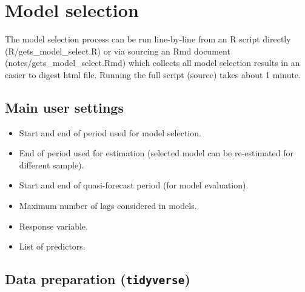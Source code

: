 \documentclass[
  letterpaper,
  DIV=11,
  numbers=noendperiod]{scrreport}
\providecommand{\tightlist}{%
  \setlength{\itemsep}{0pt}\setlength{\parskip}{0pt}}\usepackage{longtable,booktabs,array}
\begin{document}

\hypertarget{model-selection}{%
\chapter{Model selection}\label{model-selection}}

The model selection process can be run line-by-line from an R script
directly (R/gets\_model\_select.R) or via sourcing an Rmd document
(notes/gets\_model\_select.Rmd) which collects all model selection
results in an easier to digest html file. Running the full script
(source) takes about 1 minute.

\hypertarget{main-user-settings}{%
\section{Main user settings}\label{main-user-settings}}

\begin{itemize}
\tightlist
\item
  Start and end of period used for model selection.\\
\item
  End of period used for estimation (selected model can be re-estimated
  for different sample).\\
\item
  Start and end of quasi-forecast period (for model evaluation).\\
\item
  Maximum number of lags considered in models.\\
\item
  Response variable.\\
\item
  List of predictors.
\end{itemize}

\hypertarget{data-preparation-tidyverse}{%
\section{\texorpdfstring{Data preparation
(\texttt{tidyverse})}{Data preparation (tidyverse)}}\label{data-preparation-tidyverse}}
\end{document}
